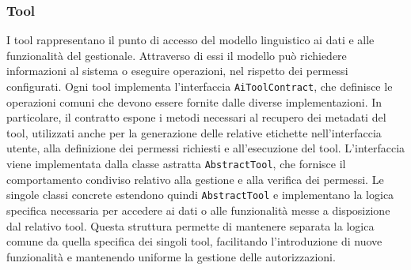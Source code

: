 \subsubsection{Tool}
I tool rappresentano il punto di accesso del modello linguistico ai dati e alle funzionalità del gestionale. Attraverso di essi il modello può richiedere informazioni 
al sistema o eseguire operazioni, nel rispetto dei permessi configurati.
\newline
Ogni tool implementa l'interfaccia \texttt{AiToolContract}, che definisce le operazioni comuni che devono essere fornite dalle diverse implementazioni. In particolare, 
il contratto espone i metodi necessari al recupero dei metadati del tool, utilizzati anche per la generazione delle relative etichette nell'interfaccia utente, alla definizione 
dei permessi richiesti e all'esecuzione del tool.
\newline
L'interfaccia viene implementata dalla classe astratta \texttt{AbstractTool}, che fornisce il comportamento condiviso relativo alla gestione e alla verifica dei permessi. Le 
singole classi concrete estendono quindi \texttt{AbstractTool} e implementano la logica specifica necessaria per accedere ai dati o alle funzionalità messe a disposizione dal 
relativo tool.
\newline
Questa struttura permette di mantenere separata la logica comune da quella specifica dei singoli tool, facilitando l'introduzione di nuove funzionalità e mantenendo uniforme 
la gestione delle autorizzazioni.

